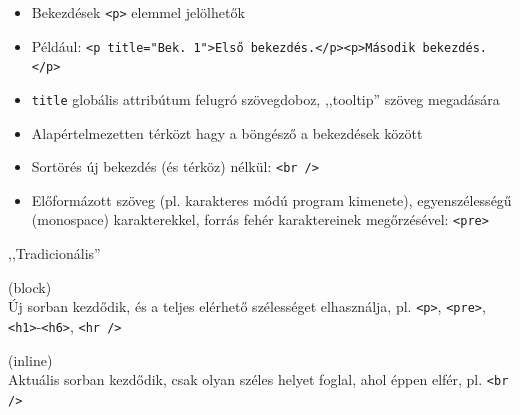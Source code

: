\begin{frame}
  \small
  \begin{itemize}
    \item Bekezdések \texttt{<p>} elemmel jelölhetők
    \item Például: \texttt{<p title="Bek. 1">Első bekezdés.</p><p>Második bekezdés.</p>}
    \item \texttt{title} globális attribútum felugró szövegdoboz, ,,tooltip'' szöveg megadására
    \item Alapértelmezetten térközt hagy a böngésző a bekezdések között
    \item Sortörés új bekezdés (és térköz) nélkül: \texttt{<br />}
    \item Előformázott szöveg (pl. karakteres módú program kimenete), egyenszélességű (monospace) karakterekkel, forrás fehér karaktereinek megőrzésével: \texttt{<pre>}
  \end{itemize}
  \vfill
  ,,Tradicionális'' 
  \begin{description}[m]
    \item[Blokkszintű] (block) \hfill \\ Új sorban kezdődik, és a teljes elérhető szélességet elhasználja, pl. \texttt{<p>}, \texttt{<pre>}, \texttt{<h1>}-\texttt{<h6>}, \texttt{<hr />}
    \item[Soron belüli] (inline) \hfill \\ Aktuális sorban kezdődik, csak olyan széles helyet foglal, ahol éppen elfér, pl. \texttt{<br />}
  \end{description}
\end{frame}


